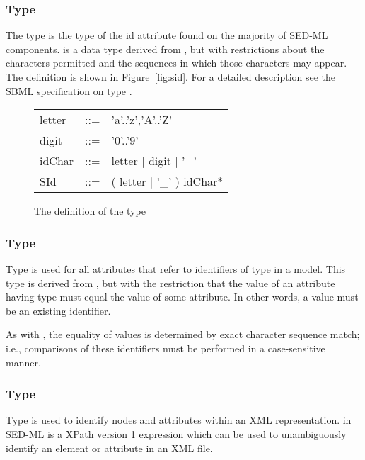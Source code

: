 \subsubsection[\element{SId}]{Type }
\label{type:sid}
The type  is the type of the id attribute found on the majority of SED-ML components.  is a data type derived from , but with restrictions about the characters permitted and the sequences in which those characters may appear. The definition is shown in Figure~\vref{fig:sid}. For a detailed description see the SBML specification on type  \citep{HBH+10}.

\begin{figure}[hbt]
  \ttfamily
  \small
  \centering
  \begin{tabular}{lll}
    letter & ::= & 'a'..'z','A'..'Z'\\
    digit  & ::= & '0'..'9'\\
    idChar & ::= & letter | digit | '\_'\\
    SId    & ::= & ( letter | '\_' ) idChar*\\
  \end{tabular}
  \vspace*{-1ex}
  \caption{The definition of the type }
  \label{fig:sid}
\end{figure}

\subsubsection[\element{SIdRef}]{Type }
\label{type:sidref}
Type  is used for all attributes that refer to identifiers of type \hyperref[type:sid]{} in a model. This type is derived from \hyperref[type:sid]{}, but with the restriction that the value of an attribute having type  must equal the value of some \hyperref[type:sid]{} attribute. In other words, a  value must be an existing identifier.

As with \hyperref[type:sid]{}, the equality of  values is determined by exact character sequence match; i.e., comparisons of these identifiers must be performed in a case-sensitive manner.

\subsubsection[\element{XPath}]{Type }
\label{type:xpath}
Type  is used to identify nodes and attributes within an XML representation.  in SED-ML is a XPath version 1 expression which can be used to unambiguously identify an element or attribute in an XML file.

